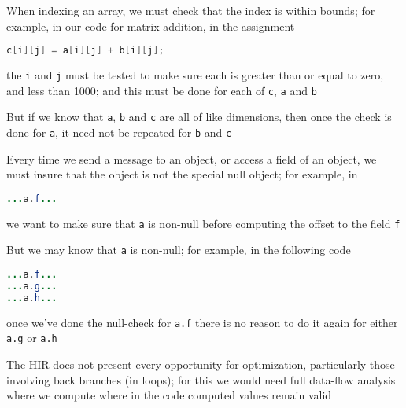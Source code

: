 \documentclass[8pt,a4paper,compress]{beamer}
\begin{document}
\begin{frame}[fragile]
\pause

When indexing an array, we must check that the index is within bounds; for example, in our code for matrix addition, in the assignment

\begin{lstlisting}[language=Java,style=focusin]
c[i][j] = a[i][j] + b[i][j];
\end{lstlisting}
\noindent the \lstinline{i} and \lstinline{j} must be tested to make sure each is greater than or equal to zero, and less than 1000; and this must be done for each of \lstinline{c}, \lstinline{a} and \lstinline{b}

\pause
\bigskip

But if we know that \lstinline{a}, \lstinline{b} and \lstinline{c} are all of like dimensions, then once the check is done for \lstinline{a}, it need not be repeated for \lstinline{b} and \lstinline{c}

\pause
\bigskip

Every time we send a message to an object, or access a field of an object, we must insure that the object is not the special null object; for example, in
\begin{lstlisting}[language=Java]
...a.f...
\end{lstlisting}
we want to make sure that \lstinline{a} is non-null before computing the offset to the field \lstinline{f}

\pause
\bigskip

But we may know that \lstinline{a} is non-null; for example, in the following code
\begin{lstlisting}[language=Java,style=focusin]
...a.f...
...a.g...
...a.h...
\end{lstlisting}
once we've done the null-check for \lstinline{a.f} there is no reason to do it again for either \lstinline{a.g} or \lstinline{a.h}

\pause
\bigskip

The HIR does not present every opportunity for optimization, particularly those involving
back branches (in loops); for this we would need full data-flow analysis where we compute where in the code computed values remain valid
\end{frame}
\end{document}
